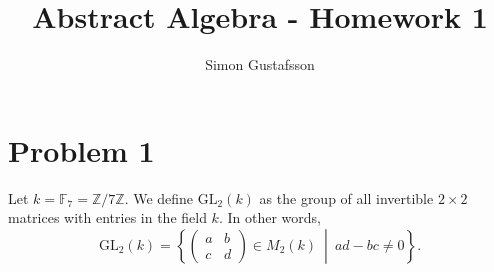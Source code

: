 \documentclass[12pt]{article}
\title{Abstract Algebra - Homework 1}
\author{Simon Gustafsson}
\date{}
\begin{document}
\maketitle
\section*{Problem 1}

Let \( k = \mathbb{F}_7 = \mathbb{Z}/7\mathbb{Z} \). We define \( \mathrm{GL}_2(k) \) as the group of all invertible \( 2 \times 2 \) matrices with entries in the field \( k \). In other words,
\[
\mathrm{GL}_2(k) = \left\{ \begin{pmatrix} a & b \\ c & d \end{pmatrix} \in M_2(k) \ \middle| \ ad - bc \neq 0 \right\}.
\]
\end{document}
